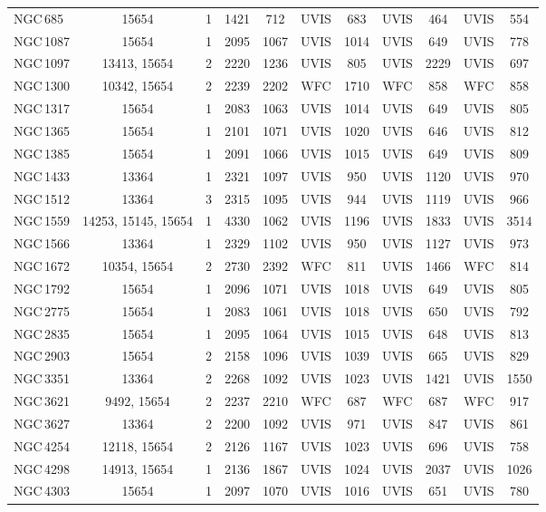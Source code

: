\documentclass[linenumbers]{aastex63}
\begin{document}
\begin{table*}
\begin{center}
\begin{tabular}{lcccccccccc}
NGC\,685 & 15654 & 1 & 1421 & 712 & UVIS & 683 & UVIS & 464 & UVIS & 554\\
NGC\,1087 & 15654 & 1 & 2095 & 1067 & UVIS & 1014 & UVIS & 649 & UVIS & 778\\
NGC\,1097 & 13413, 15654 & 2 & 2220 & 1236 & UVIS & 805 & UVIS & 2229 & UVIS & 697\\
NGC\,1300 & 10342, 15654 & 2 & 2239 & 2202 & WFC & 1710 & WFC & 858 & WFC & 858\\
NGC\,1317 & 15654 & 1 & 2083 & 1063 & UVIS & 1014 & UVIS & 649 & UVIS & 805\\
NGC\,1365 & 15654 & 1 & 2101 & 1071 & UVIS & 1020 & UVIS & 646 & UVIS & 812\\
NGC\,1385 & 15654 & 1 & 2091 & 1066 & UVIS & 1015 & UVIS & 649 & UVIS & 809\\
NGC\,1433 & 13364 & 1 & 2321 & 1097 & UVIS & 950 & UVIS & 1120 & UVIS & 970\\
NGC\,1512 & 13364 & 3 & 2315 & 1095 & UVIS & 944 & UVIS & 1119 & UVIS & 966\\
NGC\,1559 & 14253, 15145, 15654 & 1 & 4330 & 1062 & UVIS & 1196 & UVIS & 1833 & UVIS & 3514\\
NGC\,1566 & 13364 & 1 & 2329 & 1102 & UVIS & 950 & UVIS & 1127 & UVIS & 973\\
NGC\,1672 & 10354, 15654 & 2 & 2730 & 2392 & WFC & 811 & UVIS & 1466 & WFC & 814\\
NGC\,1792 & 15654 & 1 & 2096 & 1071 & UVIS & 1018 & UVIS & 649 & UVIS & 805\\
NGC\,2775 & 15654 & 1 & 2083 & 1061 & UVIS & 1018 & UVIS & 650 & UVIS & 792\\
NGC\,2835 & 15654 & 1 & 2095 & 1064 & UVIS & 1015 & UVIS & 648 & UVIS & 813\\
NGC\,2903 & 15654 & 2 & 2158 & 1096 & UVIS & 1039 & UVIS & 665 & UVIS & 829\\
NGC\,3351 & 13364 & 2 & 2268 & 1092 & UVIS & 1023 & UVIS & 1421 & UVIS & 1550\\
NGC\,3621 & 9492, 15654 & 2 & 2237 & 2210 & WFC & 687 & WFC & 687 & WFC & 917\\
NGC\,3627 & 13364 & 2 & 2200 & 1092 & UVIS & 971 & UVIS & 847 & UVIS & 861\\
NGC\,4254 & 12118, 15654 & 2 & 2126 & 1167 & UVIS & 1023 & UVIS & 696 & UVIS & 758\\
NGC\,4298 & 14913, 15654 & 1 & 2136 & 1867 & UVIS & 1024 & UVIS & 2037 & UVIS & 1026\\
NGC\,4303 & 15654 & 1 & 2097 & 1070 & UVIS & 1016 & UVIS & 651 & UVIS & 780\\

\end{tabular}
\end{center}
\end{table*}
\end{document}
